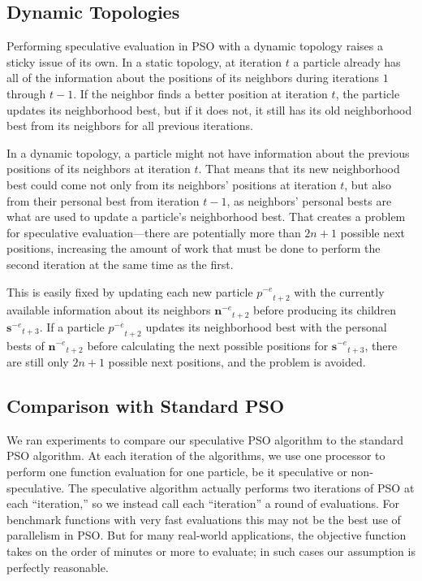 \documentclass[journal,letterpaper]{IEEEtran}
\providecommand{\noeval}[1]{\ensuremath{#1^{-e}}}
\providecommand{\p}{\ensuremath{p}}
\providecommand{\sset}{\ensuremath{\mathbf{s}}}
\providecommand{\nset}{\ensuremath{\mathbf{n}}}
\begin{document}
\subsection{Dynamic Topologies}

Performing speculative evaluation in PSO with a dynamic topology raises a
sticky issue of its own.  In a static topology, at iteration $t$ a particle
already has all of the information about the positions of its neighbors during
iterations $1$ through $t-1$.  If the neighbor finds a better position at
iteration $t$, the particle updates its neighborhood best, but if it does not,
it still has its old neighborhood best from its neighbors for all previous
iterations.

In a dynamic topology, a particle might not have information about the previous
positions of its neighbors at iteration $t$.  That means that its new
neighborhood best could come not only from its neighbors' positions at
iteration $t$, but also from their personal best from iteration $t-1$, as
neighbors' personal bests are what are used to update a particle's neighborhood
best.  That creates a problem for speculative evaluation---there are
potentially more than $2n+1$ possible next positions, increasing the amount of
work that must be done to perform the second iteration at the same time as the
first.

This is easily fixed by updating each new particle $\noeval{\p}_{t+2}$ with the
currently available information about its neighbors $\noeval{\nset}_{t+2}$
before producing its children $\noeval{\sset}_{t+3}$.  If a particle
$\noeval{\p}_{t+2}$ updates its neighborhood best with the personal bests of
$\noeval{\nset}_{t+2}$ before calculating the next possible positions for
$\noeval{\sset}_{t+3}$, there are still only $2n+1$ possible next positions,
and the problem is avoided.

\subsection{Comparison with Standard PSO}
\label{sec:results}

We ran experiments to compare our speculative PSO algorithm to the standard
PSO algorithm.  At each iteration of the algorithms, we use one processor to
perform one function evaluation for one particle, be it speculative or
non-speculative.  The speculative algorithm actually performs two iterations of
PSO at each ``iteration,'' so we instead call each ``iteration'' a round of
evaluations.  For benchmark functions with very fast evaluations this may not
be the best use of parallelism in PSO.  But for many real-world applications,
the objective function takes on the order of minutes or more to evaluate; in
such cases our assumption is perfectly reasonable.
\end{document}
